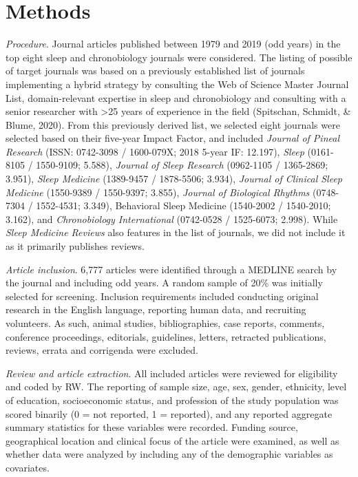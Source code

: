 \documentclass[
  english,
  jou,floatsintext]{apa6}
\begin{document}
\hypertarget{methods}{%
\section{Methods}\label{methods}}

\emph{Procedure}. Journal articles published between 1979 and 2019 (odd years) in the top eight sleep and chronobiology journals were considered. The listing of possible of target journals was based on a previously established list of journals implementing a hybrid strategy by consulting the Web of Science Master Journal List, domain-relevant expertise in sleep and chronobiology and consulting with a senior researcher with \textgreater25 years of experience in the field (Spitschan, Schmidt, \& Blume, 2020). From this previously derived list, we selected eight journals were selected based on their five-year Impact Factor, and included \emph{Journal of Pineal Research} (ISSN: 0742-3098 / 1600-079X; 2018 5-year IF: 12.197), \emph{Sleep} (0161-8105 / 1550-9109; 5.588), \emph{Journal of Sleep Research} (0962-1105 / 1365-2869; 3.951), \emph{Sleep Medicine} (1389-9457 / 1878-5506; 3.934), \emph{Journal of Clinical Sleep Medicine} (1550-9389 / 1550-9397; 3.855), \emph{Journal of Biological Rhythms} (0748-7304 / 1552-4531; 3.349), Behavioral Sleep Medicine (1540-2002 / 1540-2010; 3.162), and \emph{Chronobiology International} (0742-0528 / 1525-6073; 2.998). While \emph{Sleep Medicine Reviews} also features in the list of journals, we did not include it as it primarily publishes reviews.

\emph{Article inclusion}. 6,777 articles were identified through a MEDLINE search by the journal and including odd years. A random sample of 20\% was initially selected for screening. Inclusion requirements included conducting original research in the English language, reporting human data, and recruiting volunteers. As such, animal studies, bibliographies, case reports, comments, conference proceedings, editorials, guidelines, letters, retracted publications, reviews, errata and corrigenda were excluded.

\emph{Review and article extraction}. All included articles were reviewed for eligibility and coded by RW. The reporting of sample size, age, sex, gender, ethnicity, level of education, socioeconomic status, and profession of the study population was scored binarily (0 = not reported, 1 = reported), and any reported aggregate summary statistics for these variables were recorded. Funding source, geographical location and clinical focus of the article were examined, as well as whether data were analyzed by including any of the demographic variables as covariates.
\end{document}
